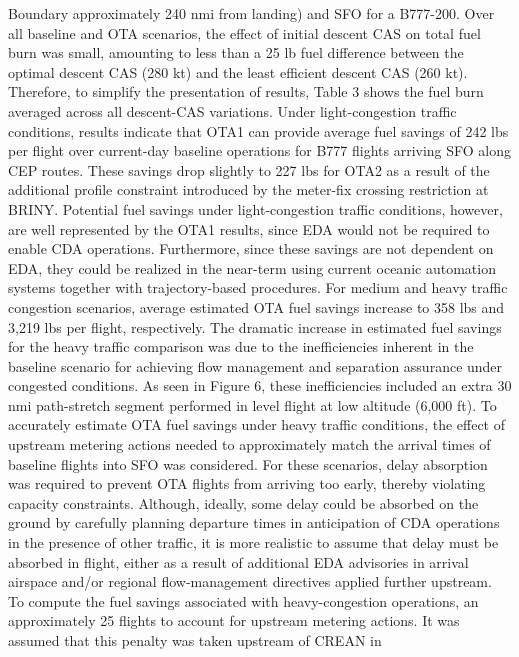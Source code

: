 \documentclass{aer1315-pretty}
\begin{document}
\begin{itemize}
Boundary approximately 240 nmi from landing) and SFO for a B777-200. Over all baseline and OTA scenarios, the
effect of initial descent CAS on total fuel burn was small, amounting to less than a 25 lb fuel difference between the
optimal descent CAS (280 kt) and the least efficient descent CAS (260 kt). Therefore, to simplify the presentation of
results, Table 3 shows the fuel burn averaged across all descent-CAS variations.
    Under light-congestion traffic conditions, results indicate that OTA1 can provide average fuel savings of 242 lbs
per flight over current-day baseline operations for B777 flights arriving SFO along CEP routes. These savings drop
slightly to 227 lbs for OTA2 as a result of the additional profile constraint introduced by the meter-fix crossing
restriction at BRINY. Potential fuel savings under light-congestion traffic conditions, however, are well represented
by the OTA1 results, since EDA would not be required to enable CDA operations. Furthermore, since these savings
are not dependent on EDA, they could be realized in the near-term using current oceanic automation systems
together with trajectory-based procedures.
    For medium and heavy traffic congestion scenarios, average estimated OTA fuel savings increase to 358 lbs and
3,219 lbs per flight, respectively. The dramatic increase in estimated fuel savings for the heavy traffic comparison
was due to the inefficiencies inherent in the baseline scenario for achieving flow management and separation
assurance under congested conditions. As seen in Figure 6, these inefficiencies included an extra 30 nmi path-stretch
segment performed in level flight at low altitude (6,000 ft). To accurately estimate OTA fuel savings under heavy
traffic conditions, the effect of upstream metering actions needed to approximately match the arrival times of
baseline flights into SFO was considered. For these scenarios, delay absorption was required to prevent OTA flights
from arriving too early, thereby violating capacity constraints. Although, ideally, some delay could be absorbed on
the ground by carefully planning departure times in anticipation of CDA operations in the presence of other traffic, it
is more realistic to assume that delay must be absorbed in flight, either as a result of additional EDA advisories in
arrival airspace and/or regional flow-management directives applied further upstream. To compute the fuel savings
associated with heavy-congestion operations, an approximately 25%
flights to account for upstream metering actions. It was assumed that this penalty was taken upstream of CREAN in

\end{itemize}
\end{document}
